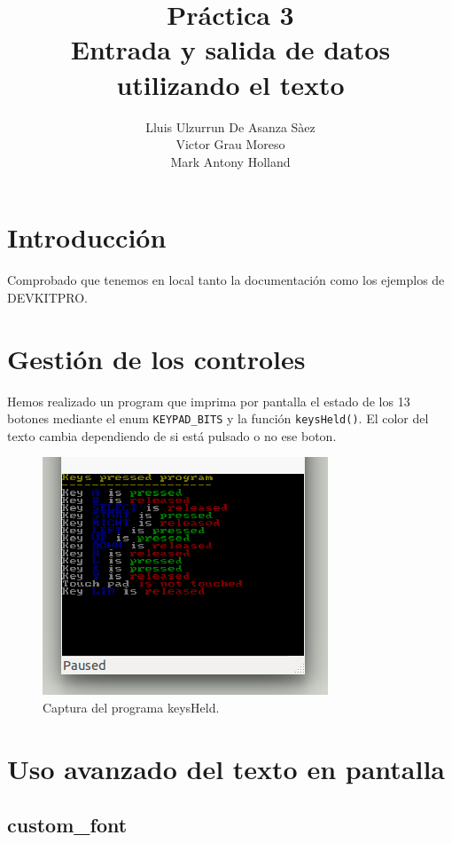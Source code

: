 \documentclass[12pt,english]{article}
\title{Práctica 3\\ Entrada y salida de datos utilizando el texto}
\author{Lluis Ulzurrun De Asanza Sàez\\Victor Grau Moreso \\Mark Antony Holland}
\date{}
\begin{document}
    \maketitle

    \tableofcontents

    \newpage
    
    \section{Introducción}

    Comprobado que tenemos en local tanto la documentación como los ejemplos de DEVKITPRO.

    \section{Gestión de los controles}

    Hemos realizado un program que imprima por pantalla el estado de los 13 botones mediante el enum \texttt{KEYPAD\_BITS} y la función \texttt{keysHeld()}. El color del texto cambia dependiendo de si está pulsado o no ese boton.
    
    \begin{figure}[H] 
    \centering
    \includegraphics[scale=0.5]{images/keysHeld}
    \caption{Captura del programa keysHeld.}
    \end{figure}

    \newpage

    \section{Uso avanzado del texto en pantalla}

    \subsection{custom\_font}
\end{document}
